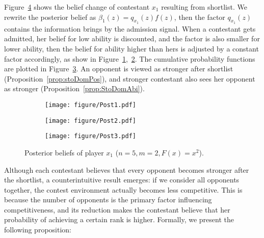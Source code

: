 
\begin{example}
    Figure~\ref{fig:beliefs} shows the belief change of contestant $x_1$ resulting from shortlist. We rewrite the posterior belief as $\beta_1(z)=q_{x_1}(z)f(z)$, then the factor $q_{x_1}(z)$ contains the information brings by the admission signal. When a contestant gets admitted, her belief for low ability is discounted, and the factor is also smaller for lower ability, then the belief for ability higher than hers is adjusted by a constant factor accordingly, as show in Figure~\ref{fig:beliefs-a},~\ref{fig:beliefs-b}. The cumulative probability functions are plotted in Figure~\ref{fig:beliefs-c}. An opponent is viewed as stronger after shortlist (Proposition~\ref{prop:stoDomPos}), and stronger contestant also sees her opponent as stronger (Proposition~\ref{prop:StoDomAbi}).
        \begin{figure}[h]
        \centering
    \begin{subfigure}[ht]{0.30\textwidth}
        \centering
        \texttt{[image: figure/Post1.pdf]}
        \label{fig:beliefs-a}
        \end{subfigure}%
    \begin{subfigure}[ht]{0.30\textwidth}
        \centering
        \texttt{[image: figure/Post2.pdf]}
        \label{fig:beliefs-b}
        \end{subfigure}%
    \begin{subfigure}[ht]{0.30\textwidth}
        \centering
        \texttt{[image: figure/Post3.pdf]}
        \label{fig:beliefs-c}
        \end{subfigure}
    \caption{Posterior beliefs of player $x_1$ ($n = 5,m=2,F(x)=x^2$).}
    \label{fig:beliefs}
    \end{figure}
\end{example}
Although each contestant believes that every opponent becomes stronger after the shortlist, a counterintuitive result emerges: if we consider all opponents together, the contest environment actually becomes less competitive. This is because the number of opponents is the primary factor influencing competitiveness, and its reduction makes the contestant believe that her probability of achieving a certain rank is higher. Formally, we present the following proposition:
